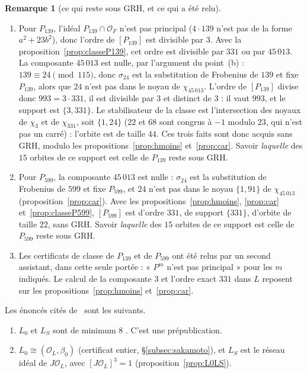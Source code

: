 \documentclass[11pt,a4paper]{amsart}
\theoremstyle{plain}
\theoremstyle{definition}
\newtheorem{remarque}[theoreme]{Remarque}
\numberwithin{equation}{section}
\newcommand{\OO}{\mathcal{O}}
\newcommand{\Lz}{L_{0}}
\newcommand{\LS}{L_{S}}
\begin{document}
\begin{remarque}[ce qui reste sous GRH, et ce qui a été relu]\label{rem:classes}
\begin{enumerate}[label=\textup{(\alph*)}]
\item Pour $P_{139}$, l'idéal $P_{139}\cap\OO_F$ n'est pas principal ($4\cdot139$ n'est pas de la forme $a^2+23b^2$), donc l'ordre de $[P_{139}]$ est divisible par $3$. Avec la proposition~\ref{prop:classeP139}, cet ordre est divisible par $331$ ou par $45\,013$. La composante $45\,013$ est nulle, par l'argument du point~(b) : $139\equiv24\pmod{115}$, donc $\sigma_{24}$ est la substitution de Frobenius de $139$ et fixe $P_{139}$, alors que $24$ n'est pas dans le noyau de $\chi_{45\,013}$. L'ordre de $[P_{139}]$ divise donc $993=3\cdot331$, il est divisible par $3$ et distinct de $3$ : il vaut $993$, et le support est $\{3,331\}$. Le stabilisateur de la classe est l'intersection des noyaux de $\chi_3$ et de $\chi_{331}$, soit $\{1,24\}$ ($22$ et $68$ sont congrus à $-1$ modulo $23$, qui n'est pas un carré) : l'orbite est de taille $44$. Ces trois faits sont donc acquis sans GRH, modulo les propositions~\ref{prop:hmoins} et~\ref{prop:car}. Savoir \emph{laquelle} des $15$ orbites de ce support est celle de $P_{139}$ reste sous GRH.
\item Pour $P_{599}$, la composante $45\,013$ est nulle : $\sigma_{24}$ est la substitution de Frobenius de $599$ et fixe $P_{599}$, et $24$ n'est pas dans le noyau $\{1,91\}$ de $\chi_{45\,013}$ (proposition~\ref{prop:car}). Avec les propositions~\ref{prop:hmoins}, \ref{prop:car} et~\ref{prop:classeP599}, $[P_{599}]$ est d'ordre $331$, de support $\{331\}$, d'orbite de taille $22$, sans GRH. Savoir \emph{laquelle} des $15$ orbites de ce support est celle de $P_{599}$ reste sous GRH.
\item Les certificats de classe de $P_{139}$ et de $P_{599}$ ont été relus par un second assistant, dans cette seule portée : « $P^m$ n'est pas principal » pour les $m$ indiqués. Le calcul de la composante $3$ et l'ordre exact $331$ dans $L$ reposent sur les propositions~\ref{prop:hmoins} et~\ref{prop:car}.
\end{enumerate}
\end{remarque}

Les énoncés cités de~\cite{Sak26} sont les suivants.
\begin{enumerate}[label=\textup{(S\arabic*)}]
\item $\Lz$ et $\LS$ sont de minimum $8$ \cite[\S5, prop.~5.5]{Sak26}. C'est une prépublication.
\item $\Lz\cong(\OO_L,\beta_0)$ (certificat entier, \S\ref{subsec:sakamoto}), et $\LS$ est le réseau idéal de $J\OO_L$, avec $[J\OO_L]^3=1$ (proposition~\ref{prop:L0LS}).
\end{enumerate}
\end{document}
